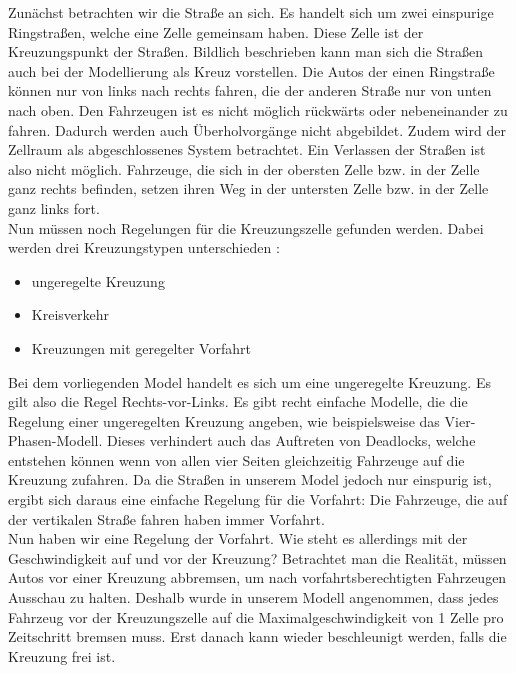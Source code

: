 Zunächst betrachten wir die Straße an sich. Es handelt sich um zwei einspurige Ringstraßen, welche eine Zelle gemeinsam haben. Diese Zelle ist der Kreuzungspunkt der Straßen. Bildlich beschrieben kann man sich die Straßen auch bei der Modellierung als Kreuz vorstellen. Die Autos der einen Ringstraße können nur von links nach rechts fahren, die der anderen Straße nur von unten nach oben. Den Fahrzeugen ist es nicht möglich rückwärts oder nebeneinander zu fahren. Dadurch werden auch Überholvorgänge nicht abgebildet. Zudem wird der Zellraum als abgeschlossenes System betrachtet. Ein Verlassen der Straßen ist also nicht möglich. Fahrzeuge, die sich in der obersten Zelle bzw. in der Zelle ganz rechts befinden, setzen ihren Weg in der untersten Zelle bzw. in der Zelle ganz links fort. \\

Nun müssen noch Regelungen für die Kreuzungszelle gefunden werden. Dabei werden drei Kreuzungstypen unterschieden \cite{book:bungartz}:
\begin{itemize}
	\item ungeregelte Kreuzung
      \item Kreisverkehr
      \item Kreuzungen mit geregelter Vorfahrt
\end{itemize}

Bei dem vorliegenden Model handelt es sich um eine ungeregelte Kreuzung. Es gilt also die Regel \glqq Rechts-vor-Links\grqq. Es gibt recht einfache Modelle, die die Regelung einer ungeregelten Kreuzung angeben, wie beispielsweise das Vier-Phasen-Modell. Dieses verhindert auch das Auftreten von Deadlocks, welche entstehen können wenn von allen vier Seiten gleichzeitig Fahrzeuge auf die Kreuzung zufahren. Da die Straßen in unserem Model jedoch nur einspurig ist, ergibt sich daraus eine einfache Regelung für die Vorfahrt: Die Fahrzeuge, die auf der vertikalen Straße fahren haben immer Vorfahrt. \\

Nun haben wir eine Regelung der Vorfahrt. Wie steht es allerdings mit der Geschwindigkeit auf und vor der Kreuzung? Betrachtet man die Realität, müssen Autos vor einer Kreuzung abbremsen, um nach vorfahrtsberechtigten Fahrzeugen Ausschau zu halten. Deshalb wurde in unserem Modell angenommen, dass jedes Fahrzeug vor der Kreuzungszelle auf die Maximalgeschwindigkeit von 1 Zelle pro Zeitschritt bremsen muss. Erst danach kann wieder beschleunigt werden, falls die Kreuzung frei ist. 
